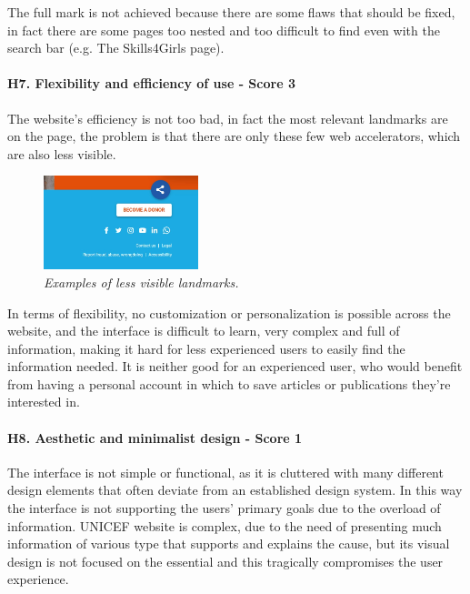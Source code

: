 \newline The full mark is not achieved because there are some flaws that should be fixed, in fact there are some pages too nested and too difficult to find even with the search bar (e.g. The Skills4Girls page).
\newline
\newline \paragraph{H7. Flexibility and efficiency of use - Score 3} \label{subsec:H7}	The website's efficiency is not too bad, in fact the most relevant landmarks are on the page, the problem is that there are only these few web accelerators, which are also less visible.
\begin{figure}[!h]
	\begin{center}
		\includegraphics[width=0.4\textwidth]{FinalScores13.jpg}
		\captionsetup{font=small}
		\caption{\textit{Examples of less visible landmarks.}}
	\end{center}
\end{figure}
\newline In terms of flexibility, no customization or personalization is possible across the website, and the interface is difficult to learn, very complex and full of information, making it hard for less experienced users to easily find the information needed. It is neither good for an experienced user, who would benefit from having a personal account in which to save articles or publications they're interested in.
\newline
\newline \paragraph{H8. Aesthetic and minimalist design - Score 1} \label{subsec:H8}	The interface is not simple or functional, as it is cluttered with many different design elements that often deviate from an established design system. In this way the interface is not supporting the users’ primary goals due to the overload of information.
\newline UNICEF website is complex, due to the need of presenting much information of various type that supports and explains the cause, but its visual design is not focused on the essential and this tragically compromises the user experience.
